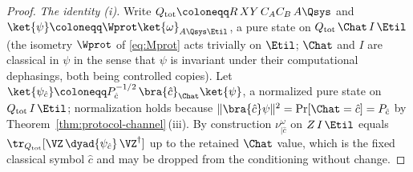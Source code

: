 \begin{proof}
\emph{The identity (i).} Write $Q_{\mathrm{tot}}\coloneqq R\,XY\,C_AC_B\,A\Qsys$ and
$\ket{\psi}\coloneqq\Wprot\ket{\omega}_{A\Qsys\Etil}$, a pure state on
$Q_{\mathrm{tot}}\,\Chat\,I\,\Etil$ (the isometry $\Wprot$ of
\eqref{eq:Mprot} acts trivially on $\Etil$; $\Chat$ and $I$ are classical
in $\psi$ in the sense that $\psi$ is invariant under their computational
dephasings, both being controlled copies). Let
$\ket{\psi_{\hat c}}\coloneqq
P_{\hat c}^{-1/2}\,\bra{\hat c}_{\Chat}\ket{\psi}$, a normalized pure state
on $Q_{\mathrm{tot}}\,I\,\Etil$; normalization holds because
$\|\bra{\hat c}\psi\|^2=\Pr[\Chat=\hat c]=P_{\hat c}$ by
Theorem~\ref{thm:protocol-channel}\,(iii). By construction
$\nu^{\omega}_{|\hat c}$ on $Z\,I\,\Etil$ equals
$\tr_{Q_{\mathrm{tot}}}[\VZ\,\dyad{\psi_{\hat c}}\,\VZ^{\dagger}]$ up to the
retained $\Chat$ value, which is the fixed classical symbol $\hat c$ and may
be dropped from the conditioning without change.


\end{proof}
